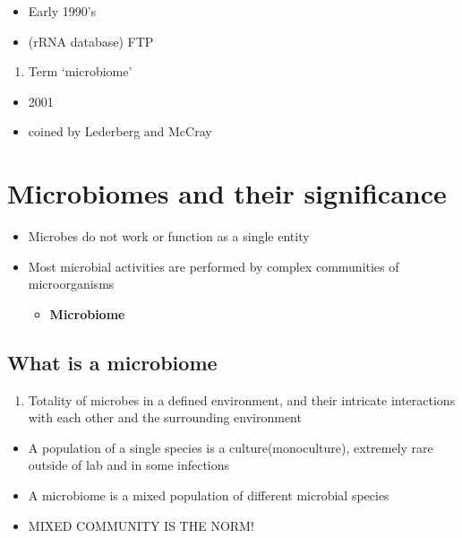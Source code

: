 \documentclass[
]{book}
\providecommand{\tightlist}{%
  \setlength{\itemsep}{0pt}\setlength{\parskip}{0pt}}
\begin{document}
\begin{itemize}
\tightlist
\item
  Early 1990's
\item
  (rRNA database) FTP
\end{itemize}

\begin{enumerate}
\def\labelenumi{\arabic{enumi}.}
\setcounter{enumi}{5}
\tightlist
\item
  Term `microbiome'
\end{enumerate}

\begin{itemize}
\tightlist
\item
  2001
\item
  coined by Lederberg and McCray
\end{itemize}

\hypertarget{microbiomes-and-their-significance}{%
\section{Microbiomes and their significance}\label{microbiomes-and-their-significance}}

\begin{itemize}
\tightlist
\item
  Microbes do not work or function as a single entity
\item
  Most microbial activities are performed by complex communities of microorganisms

  \begin{itemize}
  \tightlist
  \item
    \textbf{Microbiome}
  \end{itemize}
\end{itemize}

\hypertarget{what-is-a-microbiome}{%
\subsection{What is a microbiome}\label{what-is-a-microbiome}}

\begin{enumerate}
\def\labelenumi{\arabic{enumi}.}
\tightlist
\item
  Totality of microbes in a defined environment, and their intricate interactions with each other and the surrounding environment
\end{enumerate}

\begin{itemize}
\tightlist
\item
  A population of a single species is a culture(monoculture), extremely rare outside of lab and in some infections
\item
  A microbiome is a mixed population of different microbial species
\item
  MIXED COMMUNITY IS THE NORM!
\end{itemize}
\end{document}
